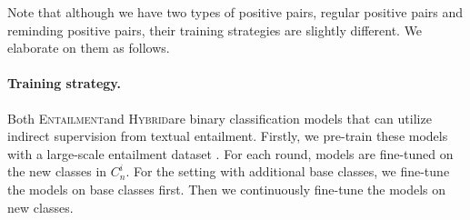 \documentclass[11pt]{article}
\newcommand{\modelname}{\textsc{Entailment}}
\newcommand{\hybrid}{\textsc{Hybrid}}
\begin{document}
Note that although we have two types of positive pairs, regular positive pairs and reminding positive pairs, their training strategies are slightly different. We elaborate on them as follows.
\fi

\paragraph{Training strategy.} 

Both \modelname\enspace and \hybrid\enspace are binary classification models that can utilize indirect supervision from textual entailment. Firstly, we pre-train these models with a large-scale entailment dataset \cite{williams2018broad}. For each round, models are fine-tuned on the new classes in $C_n^i$. For the setting with additional base classes, we fine-tune the models on base classes first. Then we continuously fine-tune the models on new classes.
\end{document}
